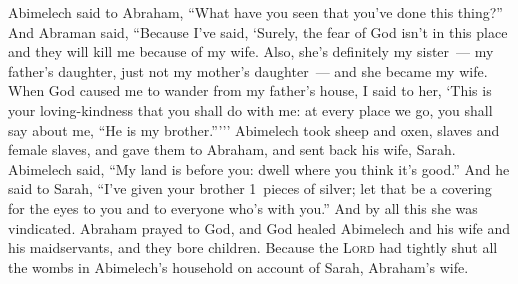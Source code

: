 \begin{inparaenum}
     Abimelech said to Abraham, ``What have you seen that you've done this thing?''%
     And Abraman said, ``Because I've said, `Surely, the fear of God isn't in this place and they will kill me because of my wife.%
     Also, she's definitely my sister~--- my father's daughter, just not my mother's daughter~--- and she became my wife.%
     When God caused me to wander from my father's house, I said to her, `This is your loving-kindness that you shall do with me: at every place we go, you shall say about me, ``He is my brother.''\thinspace'\thinspace''%
     Abimelech took sheep and oxen, slaves and female slaves, and gave them to Abraham, and sent back his wife, Sarah.%
     Abimelech said, ``My land is before you: dwell where you think it's good.''%
     And he said to Sarah, ``I've given your brother 1~pieces of silver; let that be a covering for the eyes to you and to everyone who's with you.'' And by all this she was vindicated.%
     Abraham prayed to God, and God healed Abimelech and his wife and his maidservants, and they bore children.\understood%
     Because the \textsc{Lord} had tightly shut all the wombs in Abimelech's household on account of Sarah, Abraham's wife.%
\end{inparaenum}
